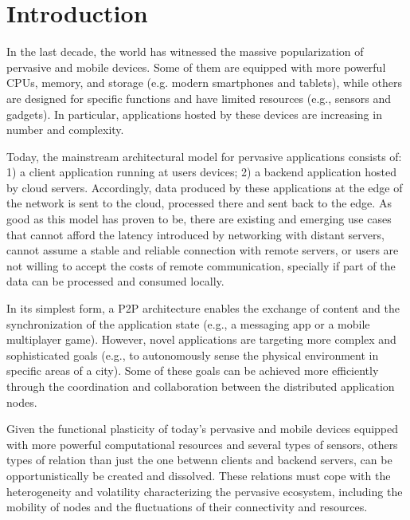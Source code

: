 \section{Introduction}
\label{sec:intro}


In the last decade, the world has witnessed the massive popularization of pervasive and mobile devices. Some of them are equipped with more powerful CPUs, memory, and storage (e.g. modern smartphones and tablets), while others are designed for specific functions and have limited resources (e.g., sensors and gadgets). In particular, applications hosted by these devices are increasing in number and complexity. 

Today, the mainstream architectural model for pervasive applications consists of: 1) a client application running at users devices; 2) a backend application hosted by cloud servers. Accordingly, data produced by these applications at the edge of the network is sent to the cloud, processed there and sent back to the edge. As good as this model has proven to be, there are existing and emerging use cases that cannot afford the latency introduced by networking with distant servers, cannot assume a stable and reliable connection with remote servers, or users are not willing to accept the costs of remote communication, specially if part of the data can be processed and consumed locally.

In its simplest form, a P2P architecture enables the exchange of content and the synchronization of the application state (e.g., a messaging app or a mobile multiplayer game). However, novel applications are targeting more complex and sophisticated goals (e.g., to autonomously sense the physical environment in specific areas of a city). Some of these goals can be achieved more efficiently through the coordination and collaboration between the distributed application nodes. 

Given the functional plasticity of today's pervasive and mobile devices equipped with more powerful computational resources and several types of sensors, 
others types of relation than just the one betwenn clients and backend servers, can be opportunistically be created and dissolved. These relations must cope with the heterogeneity and volatility characterizing the pervasive ecosystem, including the mobility of nodes and the fluctuations of their connectivity and resources. 



